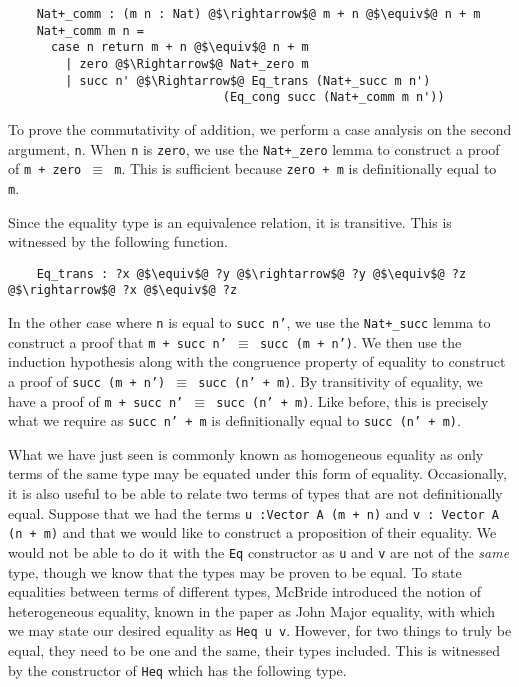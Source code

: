 \documentclass[12pt,twoside,maitrise]{dms}
\theoremstyle{definition}
\numberwithin{equation}{section}
\numberwithin{table}{chapter}
\numberwithin{figure}{chapter}
\newcommand\id[1] {\texttt{#1}}
\newcommand\fn[1] {\texttt{#1}}
\begin{document}
\begin{verbatim}
    Nat+_comm : (m n : Nat) @$\rightarrow$@ m + n @$\equiv$@ n + m
    Nat+_comm m n =
      case n return m + n @$\equiv$@ n + m
        | zero @$\Rightarrow$@ Nat+_zero m
        | succ n' @$\Rightarrow$@ Eq_trans (Nat+_succ m n')
                              (Eq_cong succ (Nat+_comm m n'))
\end{verbatim}

To prove the commutativity of addition, we perform a case analysis on the second
argument, \id{n}. When \id{n} is \id{zero}, we use the \id{Nat+\_zero} lemma to
construct a proof of \fn{m + zero $\equiv$ m}. This is sufficient because
\fn{zero + m} is definitionally equal to \id{m}.

Since the equality type is an equivalence relation, it is transitive. This is
witnessed by the following function.

\begin{verbatim}
    Eq_trans : ?x @$\equiv$@ ?y @$\rightarrow$@ ?y @$\equiv$@ ?z @$\rightarrow$@ ?x @$\equiv$@ ?z
\end{verbatim}

In the other case where \id{n} is equal to \fn{succ n'}, we use the
\id{Nat+\_succ} lemma to construct a proof that \fn{m + succ n' $\equiv$ succ
  (m + n')}. We then use the induction hypothesis along with the congruence
property of equality to construct a proof of \fn{succ (m + n') $\equiv$ succ
  (n' + m)}. By transitivity of equality, we have a proof of \fn{m + succ n'
  $\equiv$ succ (n' + m)}. Like before, this is precisely what we require as
\fn{succ n' + m} is definitionally equal to \fn{succ (n' + m)}.

What we have just seen is commonly known as homogeneous equality as only terms
of the same type may be equated under this form of equality. Occasionally, it is
also useful to be able to relate two terms of types that are not definitionally
equal. Suppose that we had the terms \fn{u :\@ Vector A (m + n)} and \fn{v :\@
  Vector A (n + m)} and that we would like to construct a proposition of their
equality. We would not be able to do it with the \fn{Eq} constructor as \id{u}
and \id{v} are not of the \emph{same} type, though we know that the types may be
proven to be equal. To state equalities between terms of different types,
McBride introduced the notion of heterogeneous
equality\cite{mcbride2000dependently}, known in the paper as John Major
equality, with which we may state our desired equality as \fn{Heq u v}. However,
for two things to truly be equal, they need to be one and the same, their types
included. This is witnessed by the constructor of \fn{Heq} which has the
following type.
\end{document}

